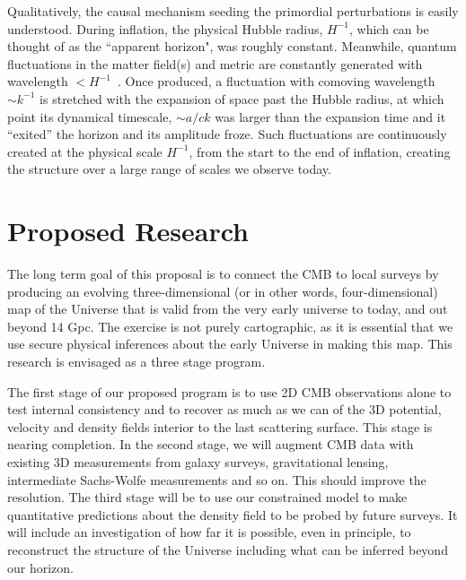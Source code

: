 \documentclass[psfig,12pt]{article}
\begin{document}
Qualitatively, the causal mechanism seeding the primordial perturbations
is easily understood. During inflation, the physical Hubble radius, $H^{-1}$,
which can be thought of as the ``apparent horizon", was roughly
constant. Meanwhile, quantum fluctuations in the matter field(s) and
metric are constantly generated with wavelength $<H^{-1}$~\cite{BirrellsBook1984}. Once produced, a fluctuation with comoving
wavelength $\sim k^{-1}$ is stretched with the expansion of space past the
Hubble radius, at which point its dynamical timescale, $\sim a/ck$ was
larger than the expansion time and it ``exited'' the horizon and its
amplitude froze.  Such fluctuations are
continuously created at the physical scale $H^{-1}$, from the start to the end of inflation, creating the structure over a large range of scales we observe today.



\section{Proposed Research}
\label{sec:research}

The long term goal of this proposal is to connect the CMB to local
surveys by producing an evolving three-dimensional (or in other
words, four-dimensional) map of the Universe that is valid from the very early universe to
today, and out beyond 14 Gpc. The exercise is not purely cartographic, as
it is essential that we use secure physical inferences
about the early Universe in making this map. This research is envisaged as a three stage program.

The first stage of our proposed program is to use 2D CMB observations alone
to test internal consistency and to recover as much as we can of the 3D
potential, velocity and density fields interior to the last scattering
surface. This stage is nearing completion. In the second stage, we will augment CMB data with existing 3D
measurements from galaxy surveys, gravitational lensing, intermediate
Sachs-Wolfe measurements and so on. This should improve the resolution.
The third  stage will be to use our constrained model to make
quantitative predictions about the density field to be probed
by future surveys. It will include an investigation of how far it is
possible, even in principle, to reconstruct the structure of the
Universe including what can be inferred beyond our horizon.
\end{document}
